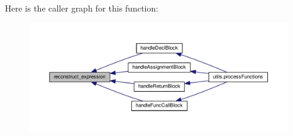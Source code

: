 Here is the caller graph for this function\+:\nopagebreak
\begin{figure}[H]
\begin{center}
\leavevmode
\includegraphics[width=350pt]{namespaceblockHandlers_a5dcb5985c58176982a44686f616daa7f_icgraph}
\end{center}
\end{figure}
